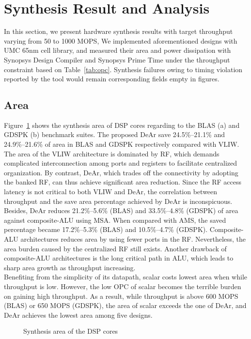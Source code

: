 \section{Synthesis Result and Analysis}
{
    In this section, we present hardware synthesis results with target throughput varying from 50 to 1000 MOPS, 
    We implemented aforementioned designs with UMC 65nm cell library, 
    and measured their area and power dissipation with Synopsys Design Compiler and Synopsys Prime Time under the throughput constraint based on Table~\ref{tab:opc}.
    Synthesis failures owing to timing violation reported by the tool would remain corresponding fields empty in figures.
    \subsection{Area}
    Figure~\ref{chart:area} shows the synthesis area of DSP cores regarding to the BLAS (a) and GDSPK (b) benchmark suites.
    The proposed DeAr save 24.5\%--21.1\% and 24.9\%--21.6\% of area in BLAS and GDSPK respectively compared with VLIW.
    The area of the VLIW architecture is dominated by RF, 
    which demands complicated interconnection among ports and registers to facilitate centralized organization.
    By contrast, DeAr, which trades off the connectivity by adopting the banked RF, can thus achieve significant area reduction.
    Since the RF access latency is not critical to both VLIW and DeAr, 
    the correlation between throughput and the save area percentage achieved by DeAr is inconspicuous.
    \\\indent Besides, DeAr reduces 21.2\%--5.6\% (BLAS) and 33.5\%--4.8\% (GDSPK) of area against composite-ALU using MSA.
    When compared with AMS, the saved percentage became 17.2\%--5.3\% (BLAS) and 10.5\%--4.7\% (GDSPK).
    Composite-ALU architectures reduces area by using fewer ports in the RF.
    Nevertheless, the area burden caused by the centralized RF still exists.
    Another drawback of composite-ALU architectures is the long critical path in ALU, 
    which leads to sharp area growth as throughput increasing.
    \\\indent Benefiting from the simplicity of its datapath, 
    scalar costs lowest area when while throughput is low.
    However, the low OPC of scalar becomes the terrible burden on gaining high throughput.
    As a result, while throughput is above 600 MOPS (BLAS) or 650 MOPS (GDSPK), 
    the area of scalar exceeds the one of DeAr, 
    and DeAr achieves the lowest area among five designs.
    \vspace{\textfig}
    \begin{figure}[!ht]
        \begin{center}
        \end{center}
        \caption{Synthesis area of the DSP cores}
        \label{chart:area}
    \end{figure}
}
